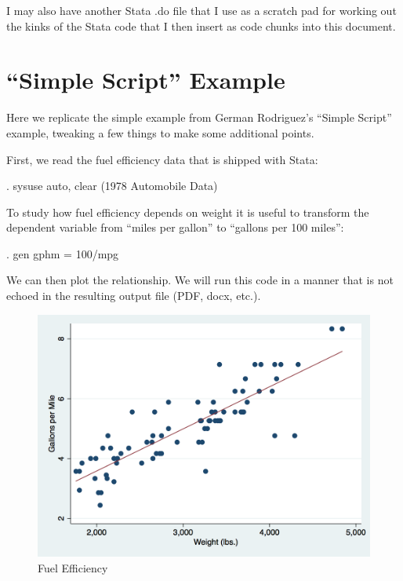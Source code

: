 \documentclass[]{article}
\begin{document}
I may also have another Stata .do file that I use as a scratch pad for
working out the kinks of the Stata code that I then insert as code
chunks into this document.

\hypertarget{simple-script-example}{%
\section{``Simple Script'' Example}\label{simple-script-example}}

Here we replicate the simple example from German Rodriguez's ``Simple
Script'' example, tweaking a few things to make some additional points.

First, we read the fuel efficiency data that is shipped with Stata:

\begin{stlog}
. sysuse auto, clear
(1978 Automobile Data)
\end{stlog}

To study how fuel efficiency depends on weight it is useful to transform
the dependent variable from ``miles per gallon'' to ``gallons per 100
miles'':

\begin{stlog}
. gen gphm = 100/mpg
\end{stlog}

We can then plot the relationship. We will run this code in a manner
that is not echoed in the resulting output file (PDF, docx, etc.).

\begin{stlog}


{\smallskip}

\end{stlog}

\begin{figure}
\centering
\includegraphics[width=0.75\linewidth]{auto.png}
\caption{Fuel Efficiency}
\end{figure}
\end{document}
